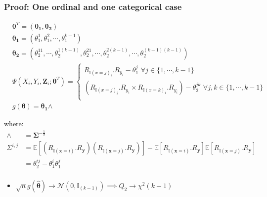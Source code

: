 \documentclass{beamer}
\begin{document}
\begin{frame}
	\frametitle{Proof: One ordinal and one categorical case}
	\begin{equation*}
		\begin{split}
			& \bm{\theta}^T = (\bm{\theta_1}, \bm{\theta_2}) \\
			& \bm{\theta_1} = (\theta_1^1, \theta_1^2, \cdots, \theta_1^{k-1}) \\
			& \bm{\theta_2} = (\theta_2^{11}, \cdots, \theta_2^{1(k-1)}, \theta_2^{21}, \cdots, \theta_2^{2(k-1)}, \cdots, \theta_2^{(k-1) (k-1)}) \\
			& \Psi(X_i, Y_i, \mathbf{Z}_i; \bm{\theta}^T) = 
				\begin{cases}
					R_{{\mathbb{I}(x=j)}_i}.R_{y_i} - \theta_1^j \, \, \forall j \in \{ 1, \cdots, k-1 \} \\
					(R_{{\mathbb{I}(x=j)}_i}.R_{y_i} \times R_{{\mathbb{I}(x=k)}_i}.R_{y_i}) - \theta_{2}^{jk} \,\, \forall j, k \in \{ 1, \cdots, k-1 \} \\
				\end{cases} \\
			& g(\bm{\theta}) = \bm{\theta_1} \bm{\wedge}
		\end{split}
	\end{equation*}

	where:
\begin{equation*}
	\begin{split}
		\bm{\wedge} &= \bm{\Sigma}^{-\frac{1}{2}} \\
		\Sigma^{i,j} &= \mathbb{E}[(R_{\mathbb{I}(\mathbf{x}=i)}.R_\mathbf{y})(R_{\mathbb{I}(\mathbf{x}=j)}.R_\mathbf{y})] - \mathbb{E}[R_{\mathbb{I}(\mathbf{x}=i)}.R_\mathbf{y}] \mathbb{E}[R_{\mathbb{I}(\mathbf{x}=j)}.R_\mathbf{y}] \\
			    &= \theta_2^{ij} - \theta_1^{i} \theta_1^{j} \\
	\end{split}
\end{equation*} 
	\begin{itemize}
		\item $ \sqrt{n}g(\hat{\bm{\theta}}) \to \mathcal{N}(0, \mathbb{I}_{(k-1)}) \implies Q_2 \to \chi^2(k-1) $
	\end{itemize}
\end{frame}
\end{document}
